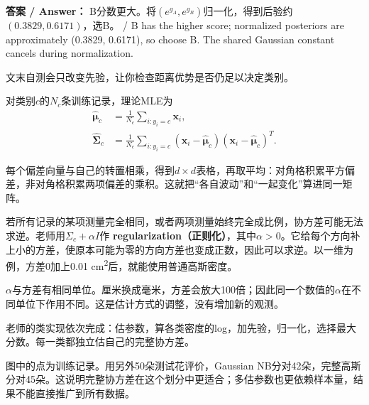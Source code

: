 \textbf{答案 / Answer：} B分数更大。将\((e^{g_A},e^{g_B})\)归一化，得到后验约\((0.3829,0.6171)\)，选B。 / B has the higher score; normalized posteriors are approximately (0.3829, 0.6171), so choose B. The shared Gaussian constant cancels during normalization.


文末自测会只改变先验，让你检查距离优势是否仍足以决定类别。








对类别\(c\)的\(N_c\)条训练记录，理论MLE为
\[
\begin{aligned}
\hat{\boldsymbol\mu}_c&=\frac1{N_c}\sum_{i:y_i=c}\mathbf x_i,\\
\hat{\boldsymbol\Sigma}_c&=\frac1{N_c}\sum_{i:y_i=c}
(\mathbf x_i-\hat{\boldsymbol\mu}_c)(\mathbf x_i-\hat{\boldsymbol\mu}_c)^T.
\end{aligned}
\tag{2.22}
\]


每个偏差向量与自己的转置相乘，得到\(d\times d\)表格，再取平均：对角格积累平方偏差，非对角格积累两项偏差的乘积。这就把“各自波动”和“一起变化”算进同一矩阵。


若所有记录的某项测量完全相同，或者两项测量始终完全成比例，协方差可能无法求逆。老师用\(\Sigma_c+\alpha I\)作 \textbf{regularization（正则化）}，其中\(\alpha>0\)。它给每个方向补上小的方差，使原本可能为零的方向方差也变成正数，因此可以求逆。以一维为例，方差0加上0.01 cm\textsuperscript{2}后，就能使用普通高斯密度。


\(\alpha\)与方差有相同单位。厘米换成毫米，方差会放大100倍；因此同一个数值的\(\alpha\)在不同单位下作用不同。这是估计方式的调整，没有增加新的观测。


老师的类实现依次完成：估参数，算各类密度的log，加先验，归一化，选择最大分数。每一类都独立估自己的完整协方差。




图中的点为训练记录。用另外50朵测试花评价，Gaussian NB分对42朵，完整高斯分对45朵。这说明完整协方差在这个划分中更适合；多估参数也更依赖样本量，结果不能直接推广到所有数据。


